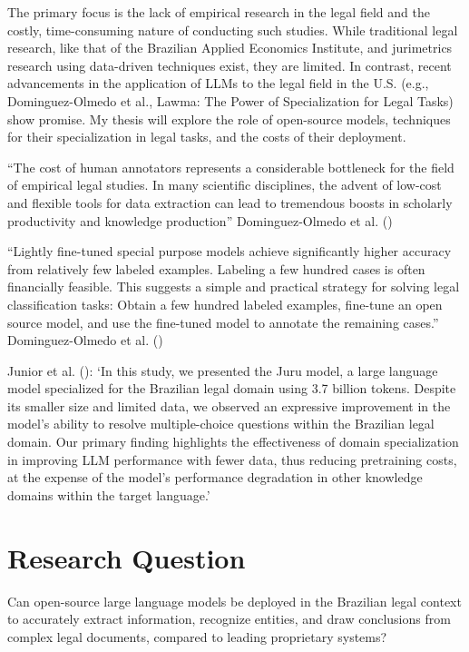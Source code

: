 \documentclass[
  12pt,
]{article}
\begin{document}
The primary focus is the lack of empirical research in the legal field
and the costly, time-consuming nature of conducting such studies. While
traditional legal research, like that of the Brazilian Applied Economics
Institute, and jurimetrics research using data-driven techniques exist,
they are limited. In contrast, recent advancements in the application of
LLMs to the legal field in the U.S. (e.g., Dominguez-Olmedo et al.,
Lawma: The Power of Specialization for Legal Tasks) show promise. My
thesis will explore the role of open-source models, techniques for their
specialization in legal tasks, and the costs of their deployment.

``The cost of human annotators represents a considerable bottleneck for
the field of empirical legal studies. In many scientific disciplines,
the advent of low-cost and flexible tools for data extraction can lead
to tremendous boosts in scholarly productivity and knowledge
production'' Dominguez-Olmedo et al.
()

``Lightly fine-tuned special purpose models achieve significantly higher
accuracy from relatively few labeled examples. Labeling a few hundred
cases is often financially feasible. This suggests a simple and
practical strategy for solving legal classification tasks: Obtain a few
hundred labeled examples, fine-tune an open source model, and use the
fine-tuned model to annotate the remaining cases.'' Dominguez-Olmedo et
al. ()

Junior et al. (): `In this study,
we presented the Juru model, a large language model specialized for the
Brazilian legal domain using 3.7 billion tokens. Despite its smaller
size and limited data, we observed an expressive improvement in the
model's ability to resolve multiple-choice questions within the
Brazilian legal domain. Our primary finding highlights the effectiveness
of domain specialization in improving LLM performance with fewer data,
thus reducing pretraining costs, at the expense of the model's
performance degradation in other knowledge domains within the target
language.'

\section{Research Question}\label{sec-research_question}

Can open-source large language models be deployed in the Brazilian legal
context to accurately extract information, recognize entities, and draw
conclusions from complex legal documents, compared to leading
proprietary systems?
\end{document}
